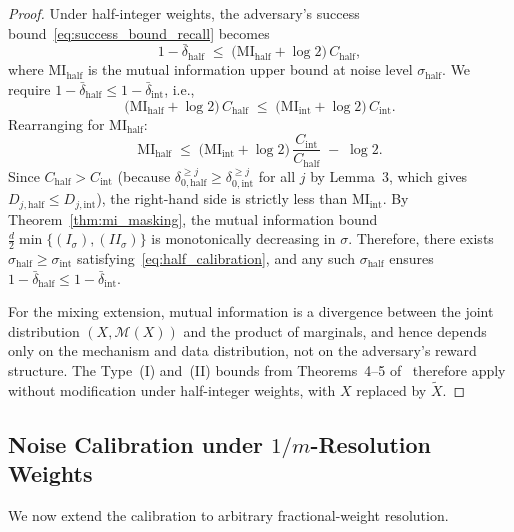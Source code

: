 \documentclass[sigconf,anonymous, review]{acmart}
\newcommand{\MI}{\mathrm{MI}}
\begin{document}
\begin{proof}
Under half-integer weights, the adversary's success bound~\eqref{eq:success_bound_recall} becomes
\[
1 - \bar{\delta}_{\mathrm{half}}
\;\le\;
\big(\MI_{\mathrm{half}} + \log 2\big)\, C_{\mathrm{half}},
\]
where $\MI_{\mathrm{half}}$ is the mutual information upper bound at noise level $\sigma_{\mathrm{half}}$. We require $1 - \bar{\delta}_{\mathrm{half}} \le 1 - \bar{\delta}_{\mathrm{int}}$, i.e.,
\[
\big(\MI_{\mathrm{half}} + \log 2\big)\, C_{\mathrm{half}}
\;\le\;
\big(\MI_{\mathrm{int}} + \log 2\big)\, C_{\mathrm{int}}.
\]
Rearranging for $\MI_{\mathrm{half}}$:
\[
\MI_{\mathrm{half}}
\;\le\;
\big(\MI_{\mathrm{int}} + \log 2\big)\,\frac{C_{\mathrm{int}}}{C_{\mathrm{half}}}
\;-\; \log 2.
\]
Since $C_{\mathrm{half}} > C_{\mathrm{int}}$ (because $\delta_{0,\mathrm{half}}^{\ge j} \ge \delta_{0,\mathrm{int}}^{\ge j}$ for all $j$ by Lemma~3, which gives $D_{j,\mathrm{half}} \le D_{j,\mathrm{int}}$), the right-hand side is strictly less than $\MI_{\mathrm{int}}$. By Theorem~\ref{thm:mi_masking}, the mutual information bound $\frac{d}{2}\min\{(I_\sigma),(II_\sigma)\}$ is monotonically decreasing in $\sigma$. Therefore, there exists $\sigma_{\mathrm{half}} \ge \sigma_{\mathrm{int}}$ satisfying~\eqref{eq:half_calibration}, and any such $\sigma_{\mathrm{half}}$ ensures $1 - \bar{\delta}_{\mathrm{half}} \le 1 - \bar{\delta}_{\mathrm{int}}$.

For the mixing extension, mutual information is a divergence between the joint distribution $(X, \mathcal{M}(X))$ and the product of marginals, and hence depends only on the mechanism and data distribution, not on the adversary's reward structure. The Type~(I) and~(II) bounds from Theorems~4--5 of~\cite{xiao2024formal} therefore apply without modification under half-integer weights, with $X$ replaced by $\tilde{X}$.
\end{proof}

\subsection{Noise Calibration under \texorpdfstring{$1/m$}{1/m}-Resolution Weights}

We now extend the calibration to arbitrary fractional-weight resolution.
\end{document}
